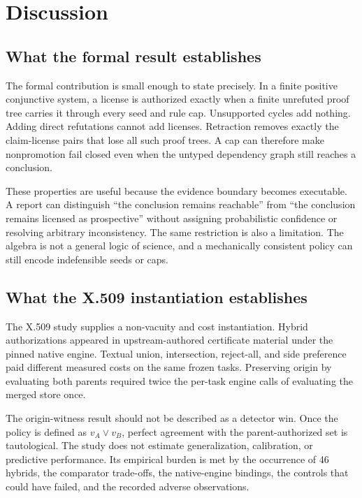 \documentclass[pdflatex,sn-mathphys-num]{sn-jnl}
\begin{document}
\section{Discussion}\label{discussion}

\subsection{What the formal result establishes}\label{what-the-formal-result-establishes}

The formal contribution is small enough to state precisely. In a finite positive conjunctive system, a license is authorized exactly when a finite unrefuted proof tree carries it through every seed and rule cap. Unsupported cycles add nothing. Adding direct refutations cannot add licenses. Retraction removes exactly the claim-license pairs that lose all such proof trees. A cap can therefore make nonpromotion fail closed even when the untyped dependency graph still reaches a conclusion.

These properties are useful because the evidence boundary becomes executable. A report can distinguish ``the conclusion remains reachable'' from ``the conclusion remains licensed as prospective'' without assigning probabilistic confidence or resolving arbitrary inconsistency. The same restriction is also a limitation. The algebra is not a general logic of science, and a mechanically consistent policy can still encode indefensible seeds or caps.

\subsection{What the X.509 instantiation establishes}\label{what-the-x.509-instantiation-establishes}

The X.509 study supplies a non-vacuity and cost instantiation. Hybrid authorizations appeared in upstream-authored certificate material under the pinned native engine. Textual union, intersection, reject-all, and side preference paid different measured costs on the same frozen tasks. Preserving origin by evaluating both parents required twice the per-task engine calls of evaluating the merged store once.

The origin-witness result should not be described as a detector win. Once the policy is defined as \(v_A\lor v_B\), perfect agreement with the parent-authorized set is tautological. The study does not estimate generalization, calibration, or predictive performance. Its empirical burden is met by the occurrence of 46 hybrids, the comparator trade-offs, the native-engine bindings, the controls that could have failed, and the recorded adverse observations.
\end{document}
